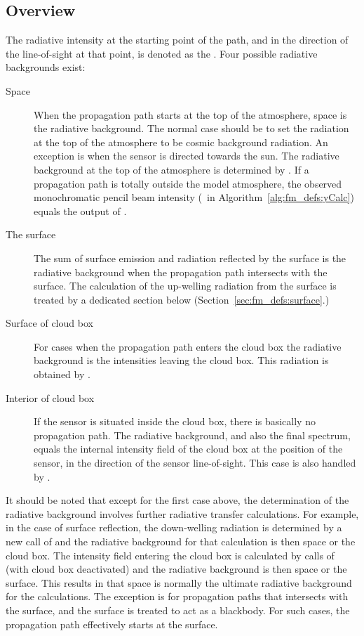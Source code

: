 \subsection{Overview}
%
The radiative intensity at the starting point of the path, and in the
direction of the line-of-sight at that point, is denoted as the
. Four possible radiative backgrounds
exist:
\begin{description}
\item[Space] When the propagation path starts at the top of the
  atmosphere, space is the radiative background. The normal case
  should be to set the radiation at the top of the atmosphere to be
  cosmic background radiation. An exception is when the sensor is
  directed towards the sun. The radiative background at the top of the
  atmosphere is determined by . If a
  propagation path is totally outside the model atmosphere, the
  observed monochromatic pencil beam intensity (\ in
  Algorithm~\ref{alg:fm_defs:yCalc}) equals the output of
  .
\item[The surface] The sum of surface emission and radiation reflected by the
  surface is the radiative background when the propagation path intersects with
  the surface. The calculation of the up-welling radiation from the surface is
  treated by a dedicated section below (Section~\ref{sec:fm_defs:surface}.)
\item[Surface of cloud box] For cases when the propagation path enters
  the cloud box the radiative background is the intensities leaving
  the cloud box. This radiation is obtained by
  . 
\item[Interior of cloud box] If the sensor is situated inside the
  cloud box, there is basically no propagation path. The radiative
  background, and also the final spectrum, equals the internal
  intensity field of the cloud box at the position of the sensor, in
  the direction of the sensor line-of-sight. This case is also handled
  by .
\end{description}
It should be noted that except for the first case above, the determination of
the radiative background involves further radiative transfer calculations. For
example, in the case of surface reflection, the down-welling radiation is
determined by a new call of  and the radiative
background for that calculation is then space or the cloud box. The intensity
field entering the cloud box is calculated by calls of
 (with cloud box deactivated) and the
radiative background is then space or the surface. This results in that space
is normally the ultimate radiative background for the calculations. The
exception is for propagation paths that intersects with the surface, and the
surface is treated to act as a blackbody. For such cases, the propagation path
effectively starts at the surface.


